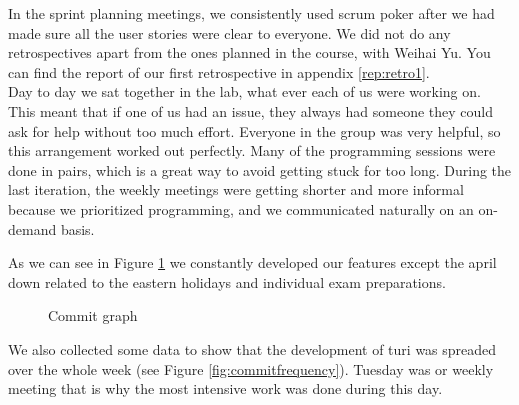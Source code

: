 \documentclass[a4paper]{article}
\begin{document}
\noindent
In the sprint planning meetings, we consistently used scrum poker after we had made sure all the user stories were clear to everyone. We did not do any retrospectives apart from the ones planned in the course, with Weihai Yu. You can find the report of our first retrospective in appendix \ref{rep:retro1}.\\

\noindent
Day to day we sat together in the lab, what ever each of us were working on. This meant that if one of us had an issue, they always had someone they could ask for help without too much effort. Everyone in the group was very helpful, so this arrangement worked out perfectly. Many of the programming sessions were done in pairs, which is a great way to avoid getting stuck for too long. During the last iteration, the weekly meetings were getting shorter and more informal because we prioritized programming, and we communicated naturally on an on-demand basis.


\noindent
As we can see in Figure \ref{fig:commitgraph} we constantly developed our features except the april down related to the eastern holidays and individual exam preparations.\\

\begin{figure}[!h]
  \begin{center}
    \caption{Commit graph}
    \label{fig:commitgraph}
  \end{center}
\end{figure}

We also collected some data to show that the development of turi was spreaded over the whole week (see Figure \ref{fig:commitfrequency}). Tuesday was or weekly meeting that is why the most intensive work was done during this day. \\
\end{document}
